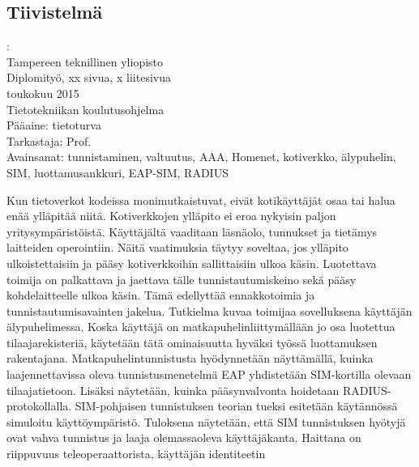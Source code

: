 \documentclass[12pt,a4paper,english]{tutthesis}
\begin{document}
\begin{otherlanguage}{finnish} %
\chapter*{Tiivistelmä}         %

\begin{spacing}{1.0}
         {\bf \textsf{\MakeUppercase{\@author}}}: \@titleB\\  %
         \textsf{Tampereen teknillinen yliopisto}\\
         \textsf{Diplomityö, xx sivua, x liitesivua}\\ %
         \textsf{toukokuu 2015}\\
         \textsf{Tietotekniikan koulutusohjelma}\\
         \textsf{Pääaine: tietoturva}\\
         \textsf{Tarkastaja:  Prof. \@examiner}\\ %
         \textsf{Avainsanat: tunnistaminen, valtuutus, AAA, Homenet, kotiverkko, älypuhelin, SIM, luottamusankkuri, EAP-SIM, RADIUS}\\
\end{spacing}
Kun tietoverkot kodeissa monimutkaistuvat, eivät kotikäyttäjät osaa tai halua enää ylläpitää niitä. Kotiverkkojen ylläpito ei  eroa nykyisin paljon yritysympäristöistä. Käyttäjältä vaaditaan läsnäolo, tunnukset ja tietämys laitteiden operointiin. Näitä vaatimuksia
täytyy soveltaa, jos ylläpito ulkoistettaisiin ja pääsy kotiverkkoihin sallittaisiin ulkoa käsin.
Luotettava toimija on palkattava ja jaettava tälle
tunnistautumiskeino sekä pääsy kohdelaitteelle ulkoa käsin. Tämä edellyttää ennakkotoimia ja tunnistautumisavainten jakelua.
Tutkielma kuvaa toimijaa sovelluksena käyttäjän älypuhelimessa.
Koska käyttäjä on matkapuhelinliittymällään jo osa luotettua
tilaajarekisteriä, käytetään tätä ominaisuutta hyväksi työssä luottamuksen rakentajana.
Matkapuhelintunnistusta hyödynnetään näyttämällä, kuinka
laajennettavissa oleva tunnistusmenetelmä EAP yhdistetään SIM-kortilla olevaan tilaajatietoon. Lisäksi näytetään, kuinka pääsynvalvonta hoidetaan RADIUS-protokollalla.
SIM-pohjaisen tunnistuksen teorian tueksi esitetään käytännössä simuloitu käyttöympäristö. Tuloksena näytetään, että SIM tunnistuksen hyötyjä ovat vahva tunnistus ja laaja olemassaoleva käyttäjäkanta. Haittana on riippuvuus teleoperaattorista, käyttäjän identiteetin

\end{otherlanguage}
\end{document}
